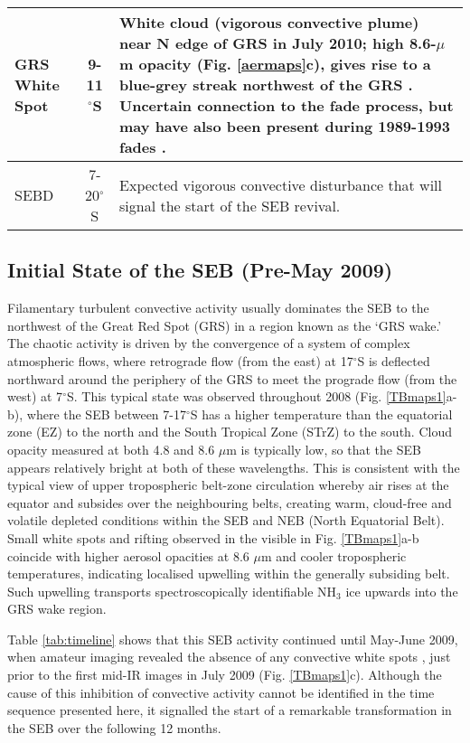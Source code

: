 \documentclass[final,5p,times,twocolumn,authoryear]{elsarticle}
\newcommand{\degree}{\ensuremath{^\circ}}
\begin{document}
\begin{table*}[htdp]
\begin{center}
\begin{tabular}{|l|c|p{12cm}|}
\hline
GRS White Spot & 9-11$^\circ$S & White cloud (vigorous convective plume) near N edge of GRS in July 2010; high 8.6-$\mu$m opacity (Fig. \ref{aermaps}c), gives rise to a blue-grey streak northwest of the GRS \citep{10rogers}. Uncertain connection to the fade process, but may have also been present during 1989-1993 fades \citep{10rogers}.  \\
\hline
SEBD & 7-20$^\circ$S & Expected vigorous convective disturbance that will signal the start of the SEB revival.\\
\hline
\end{tabular}
\end{center}
\label{tab:charac}
\label{lasttable}
\end{table*}%



\subsection{Initial State of the SEB (Pre-May 2009)}

Filamentary turbulent convective activity usually dominates the SEB to the northwest of the Great Red Spot (GRS) in a region known as the `GRS wake.'  The chaotic activity is driven by the convergence of a system of complex atmospheric flows, where retrograde flow (from the east) at 17\degree S is deflected northward around the periphery of the GRS to meet the prograde flow (from the west) at 7\degree S.  This typical state was observed throughout 2008 (Fig. \ref{TBmaps1}a-b), where the SEB between 7-17$^\circ$S has a higher temperature than the equatorial zone (EZ) to the north and the South Tropical Zone (STrZ) to the south.  Cloud opacity measured at both 4.8 and 8.6 $\mu$m is typically low, so that the SEB appears relatively bright at both of these wavelengths.   This is consistent with the typical view of upper tropospheric belt-zone circulation \citep[e.g.,][]{04ingersoll} whereby air rises at the equator and subsides over the neighbouring belts, creating warm, cloud-free and volatile depleted conditions within the SEB and NEB (North Equatorial Belt).  Small white spots and rifting observed in the visible in Fig. \ref{TBmaps1}a-b coincide with higher aerosol opacities at 8.6 $\mu$m and cooler tropospheric temperatures, indicating localised upwelling within the generally subsiding belt.  Such upwelling transports spectroscopically identifiable NH$_3$ ice \citep[SIACs,][]{02baines} upwards into the GRS wake region.   

Table \ref{tab:timeline} shows that this SEB activity continued until May-June 2009, when amateur imaging revealed the absence of any convective white spots \citep{10rogers},  just prior to the first mid-IR images in July 2009 (Fig. \ref{TBmaps1}c).  Although the cause of this inhibition of convective activity cannot be identified in the time sequence presented here, it signalled the start of a remarkable transformation in the SEB over the following 12 months.
\end{document}
